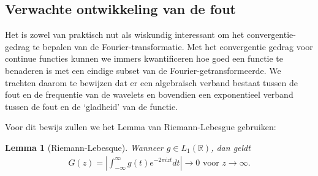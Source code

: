 \documentclass[11pt]{report}
\newcommand{\R}{\mathbb{R}}
\theoremstyle{plain}
\newtheorem*{lemm}{Lemma}
\theoremstyle{remark}
\newcommand{\eq}[1]{\begin{eqnarray*} #1 \end{eqnarray*}}
\begin{document}
\subsection{Verwachte ontwikkeling van de fout}
Het is zowel van praktisch nut als wiskundig interessant om het convergentie-gedrag te bepalen 
van de Fourier-transformatie. Met het convergentie gedrag voor continue functies kunnen we immers
kwantificeren hoe goed een functie te benaderen is met een eindige subset van de Fourier-getransformeerde.
We trachten daarom te bewijzen dat er een algebra\"isch verband bestaat tussen de fout en de frequentie
van de wavelets en bovendien een exponentieel verband tussen de fout en de `gladheid' van de functie.

Voor dit bewijs zullen we het Lemma van Riemann-Lebesgue gebruiken: 
\begin{lemm}[Riemann-Lebesque{\cite{fourier-fout}}]
Wanneer $g \in L_1(\R)$, dan geldt 
\eq{
	G(z) = \left|\int_{-\infty}^\infty g(t) e^{- 2 \pi i z t} dt\right| \to 0 \text{ voor } z \to \infty.
}
\end{lemm}
\end{document}
